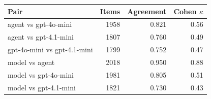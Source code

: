 \begin{tabular}{lrrr}
\toprule
Pair & Items & Agreement & Cohen $\kappa$ \\
\midrule
agent vs gpt-4o-mini & 1958 & 0.821 & 0.56 \\
agent vs gpt-4.1-mini & 1807 & 0.760 & 0.49 \\
gpt-4o-mini vs gpt-4.1-mini & 1799 & 0.752 & 0.47 \\
\midrule
model vs agent & 2018 & 0.950 & 0.88 \\
model vs gpt-4o-mini & 1981 & 0.805 & 0.51 \\
model vs gpt-4.1-mini & 1821 & 0.730 & 0.43 \\
\bottomrule
\end{tabular}
